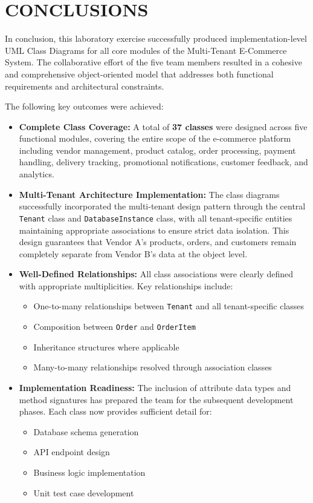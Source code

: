 \chapter{CONCLUSIONS}\label{ch:conclusion}

In conclusion, this laboratory exercise successfully produced implementation-level UML Class Diagrams for all core modules of the Multi-Tenant E-Commerce System. The collaborative effort of the five team members resulted in a cohesive and comprehensive object-oriented model that addresses both functional requirements and architectural constraints.

The following key outcomes were achieved:

\begin{itemize}
    \item \textbf{Complete Class Coverage:} A total of \textbf{37 classes} were designed across five functional modules, covering the entire scope of the e-commerce platform including vendor management, product catalog, order processing, payment handling, delivery tracking, promotional notifications, customer feedback, and analytics.
    
    \item \textbf{Multi-Tenant Architecture Implementation:} The class diagrams successfully incorporated the multi-tenant design pattern through the central \texttt{Tenant} class and \texttt{DatabaseInstance} class, with all tenant-specific entities maintaining appropriate associations to ensure strict data isolation. This design guarantees that Vendor A's products, orders, and customers remain completely separate from Vendor B's data at the object level.
    
    \item \textbf{Well-Defined Relationships:} All class associations were clearly defined with appropriate multiplicities. Key relationships include:
    \begin{itemize}
        \item One-to-many relationships between \texttt{Tenant} and all tenant-specific classes
        \item Composition between \texttt{Order} and \texttt{OrderItem}
        \item Inheritance structures where applicable
        \item Many-to-many relationships resolved through association classes
    \end{itemize}
    
    \item \textbf{Implementation Readiness:} The inclusion of attribute data types and method signatures has prepared the team for the subsequent development phases. Each class now provides sufficient detail for:
    \begin{itemize}
        \item Database schema generation
        \item API endpoint design
        \item Business logic implementation
        \item Unit test case development
    \end{itemize}
    

\end{itemize}
